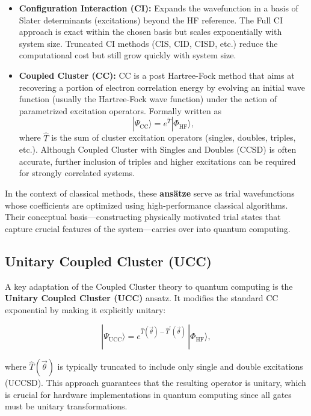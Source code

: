 \begin{itemize}
    \item \textbf{Configuration Interaction (CI):} Expands the wavefunction in a basis of Slater determinants (excitations) beyond the HF reference. The Full CI approach is exact within the chosen basis but scales exponentially with system size. Truncated CI methods (CIS, CID, CISD, etc.) reduce the computational cost but still grow quickly with system size.

    \item \textbf{Coupled Cluster (CC):} CC is a post Hartree-Fock method that aims at recovering a portion of electron correlation energy by evolving an initial wave function (usually the Hartree-Fock wave function) under the action of parametrized excitation operators. Formally written as 
    \[
       |\Psi_{\mathrm{CC}}\rangle = e^{\hat{T}}|\Phi_{\mathrm{HF}}\rangle,
    \]
    where $\hat{T}$ is the sum of cluster excitation operators (singles, doubles, triples, etc.). Although Coupled Cluster with Singles and Doubles (CCSD) is often accurate, further inclusion of triples and higher excitations can be required for strongly correlated systems.
\end{itemize}

In the context of classical methods, these \textbf{ans\"{a}tze} serve as trial wavefunctions whose coefficients are optimized using high-performance classical algorithms. Their conceptual basis---constructing physically motivated trial states that capture crucial features of the system---carries over into quantum computing.

\subsection{Unitary Coupled Cluster (UCC)}
A key adaptation of the Coupled Cluster theory to quantum computing is the \textbf{Unitary Coupled Cluster (UCC)} ansatz. It modifies the standard CC exponential by making it explicitly unitary:

\[
|\Psi_{\mathrm{UCC}}\rangle 
= e^{\hat{T}(\vec{\theta}) - \hat{T}^\dagger(\vec{\theta})} \,|\Phi_{\mathrm{HF}}\rangle,
\]

where $\hat{T}(\vec{\theta})$ is typically truncated to include only single and double excitations (UCCSD). This approach guarantees that the resulting operator is unitary, which is crucial for hardware implementations in quantum computing since all gates must be unitary transformations. 


